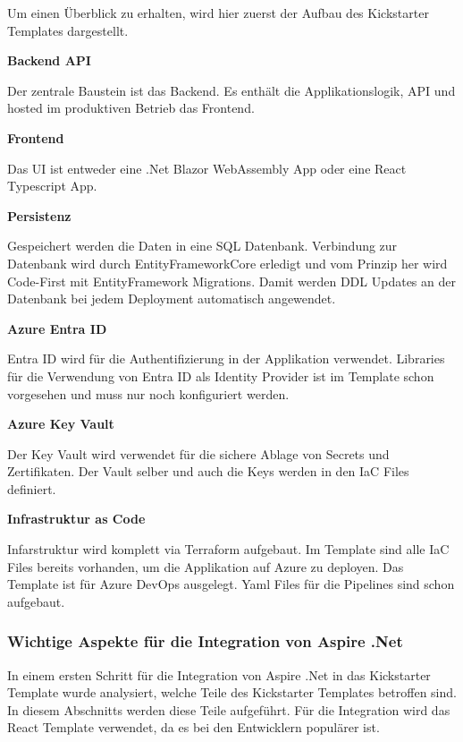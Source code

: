             Um einen Überblick zu erhalten, wird hier zuerst der Aufbau des Kickstarter Templates dargestellt.

            \textbf{Backend API}

            Der zentrale Baustein ist das Backend. Es enthält die Applikationslogik, API und hosted im produktiven Betrieb das Frontend.

            \textbf{Frontend}

            Das UI ist entweder eine .Net Blazor WebAssembly App oder eine React Typescript App. 

            \textbf{Persistenz}
            
            Gespeichert werden die Daten in eine SQL Datenbank. Verbindung zur Datenbank wird durch EntityFrameworkCore erledigt und vom Prinzip her wird Code-First mit EntityFramework Migrations. Damit werden DDL Updates an der Datenbank bei jedem Deployment automatisch angewendet.

            \textbf{Azure Entra ID}
            
            Entra ID wird für die Authentifizierung in der Applikation verwendet. Libraries für die Verwendung von Entra ID als Identity Provider ist im Template schon vorgesehen und muss nur noch konfiguriert werden.

            \textbf{Azure Key Vault}

            Der Key Vault wird verwendet für die sichere Ablage von Secrets und Zertifikaten. Der Vault selber und auch die Keys werden in den IaC Files definiert.

            \textbf{Infrastruktur as Code}

            Infarstruktur wird komplett via Terraform aufgebaut. Im Template sind alle IaC Files bereits vorhanden, um die Applikation auf Azure zu deployen. Das Template ist für Azure DevOps ausgelegt. Yaml Files für die Pipelines sind schon aufgebaut.

        \subsubsection{Wichtige Aspekte für die Integration von Aspire .Net}

            In einem ersten Schritt für die Integration von Aspire .Net in das Kickstarter Template wurde analysiert, welche Teile des Kickstarter Templates betroffen sind. In diesem Abschnitts werden diese Teile aufgeführt. Für die Integration wird das React Template verwendet, da es bei den Entwicklern populärer ist. 

